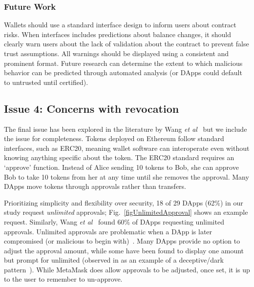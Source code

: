 \documentclass[conference]{IEEEtran}
\begin{document}
\subsubsection*{\textbf{Future Work}}
Wallets should use a standard interface design to inform users about contract risks.
When interfaces includes predictions about balance changes, it should clearly warn users about the lack of validation about the contract to prevent false trust assumptions.
All warnings should be displayed using a consistent and prominent format.
Future research can determine the extent to which malicious behavior can be predicted through automated analysis (or DApps could default to untrusted until certified). 


\subsection{Issue 4: Concerns with revocation}
The final issue has been explored in the literature by Wang \textit{et al}~\cite{wang2022penny} but we include the issue for completeness.
Tokens deployed on Ethereum follow standard interfaces, such as ERC20, meaning wallet software can interoperate even without knowing anything specific about the token.
The ERC20 standard requires an `approve' function. Instead of Alice sending 10 tokens to Bob, she can approve Bob to take 10 tokens from her at any time until she removes the approval. 
Many DApps move tokens through approvals rather than transfers.

Prioritizing simplicity and flexibility over security, 18 of 29 DApps (62\%) in our study request \textit{unlimited} approvals; Fig.~\ref{figUnlimitedApproval} shows an example request.
Similarly, Wang \textit{et al}~\cite{wang2022penny} found 60\% of DApps requesting unlimited approvals.
Unlimited approvals are problematic when a DApp is later compromised (or malicious to begin with)~\cite{incident2020Bancor,incident2021Primitive}.
Many DApps provide no option to adjust the approval amount, while some have been found to display one amount but prompt for unlimited (observed in \cite{wang2022penny} as an example of a deceptive/dark pattern~\cite{mathur2019dark}). While MetaMask does allow approvals to be adjusted, once set, it is up to the user to remember to un-approve.  
\end{document}
